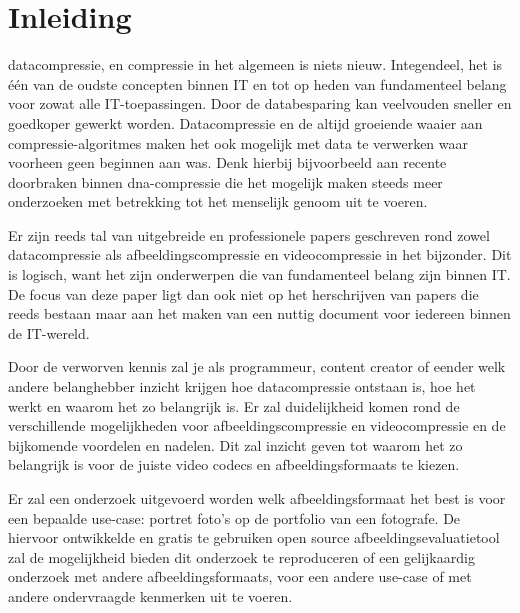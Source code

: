 
\chapter{Inleiding}
\label{ch:inleiding}

\Gls{datacompressie}, en compressie in het algemeen is niets nieuw. Integendeel, het is één van de oudste concepten binnen IT en tot op heden van fundamenteel belang voor zowat alle IT-toepassingen. Door de databesparing kan veelvouden sneller en goedkoper gewerkt worden. Datacompressie en de altijd groeiende waaier aan \glspl{compressie-algoritme} maken het ook mogelijk met data te verwerken waar voorheen geen beginnen aan was. Denk hierbij bijvoorbeeld aan recente doorbraken binnen \gls{dna-compressie} die het mogelijk maken steeds meer onderzoeken met betrekking tot het menselijk genoom uit te voeren.

Er zijn reeds tal van uitgebreide en professionele papers geschreven rond zowel \gls{datacompressie} als \gls{afbeeldingscompressie} en \gls{videocompressie} in het bijzonder. Dit is logisch, want het zijn onderwerpen die van fundamenteel belang zijn binnen IT. De focus van deze paper ligt dan ook niet op het herschrijven van papers die reeds bestaan maar aan het maken van een nuttig document voor iedereen binnen de IT-wereld. 

Door de verworven kennis zal je als programmeur, content creator of eender welk andere belanghebber inzicht krijgen hoe \gls{datacompressie} ontstaan is, hoe het werkt en waarom het zo belangrijk is. Er zal duidelijkheid komen rond de verschillende mogelijkheden voor \gls{afbeeldingscompressie} en \gls{videocompressie} en de bijkomende voordelen en nadelen. Dit zal inzicht geven tot waarom het zo belangrijk is voor de juiste video \glspl{codec} en \glspl{afbeeldingsformaat} te kiezen.

Er zal een onderzoek uitgevoerd worden welk \gls{afbeeldingsformaat} het best is voor een bepaalde \gls{use-case}: portret foto's op de portfolio van een fotografe. De hiervoor ontwikkelde en gratis te gebruiken open source  \gls{afbeeldingsevaluatietool} zal de mogelijkheid bieden dit onderzoek te reproduceren of een gelijkaardig onderzoek met andere \glspl{afbeeldingsformaat}, voor een andere \gls{use-case} of met andere ondervraagde kenmerken uit te voeren.

